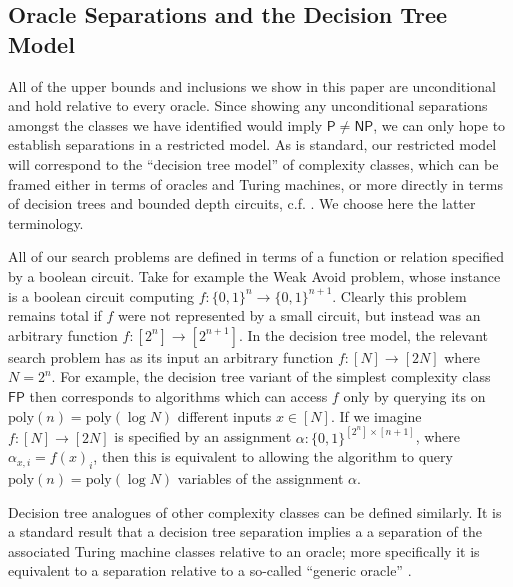 \documentclass[11pt]{article}
\newcommand{\B}{\{0,1\}}
\newcommand{\poly}{\mathrm{poly}}
\begin{document}
\subsection{Oracle Separations and the Decision Tree Model}
\label{prelim:querymodels}

All of the upper bounds and inclusions we show in this paper are unconditional and hold relative to every oracle. Since showing any unconditional separations amongst the classes we have identified would imply $\mathsf{P} \neq \mathsf{NP}$, we can only hope to establish separations in a restricted model. As is standard, our restricted model will correspond to the ``decision tree model'' of complexity classes, which can be framed either in terms of oracles and Turing machines, or more directly in terms of decision trees and bounded depth circuits, c.f. \cite{cook}. We choose here the latter terminology. 

All of our search problems are defined in terms of a function or relation specified by a boolean circuit. Take for example the Weak Avoid problem, whose instance is a boolean circuit computing $f: \B^n \to \B^{n+1}$. Clearly this problem remains total if $f$ were not represented by a small circuit, but instead was an arbitrary function $f: [2^n] \to [2^{n+1}]$. In the decision tree model, the relevant search problem has as its input an arbitrary function $f: [N] \to [2N]$ where $N = 2^n$. For example, the decision tree variant of the simplest complexity class $\mathsf{FP}$ then corresponds to algorithms which can access $f$ only by querying its on $\poly(n) = \poly(\log N)$ different inputs $x \in [N]$. If we imagine $f: [N] \to [2N]$ is specified by an assignment $\alpha: \B^{[2^n] \times [n+1]}$, where $\alpha_{x,i} = f(x)_i$, then this is equivalent to allowing the algorithm to query $\poly(n)=\poly(\log N)$ variables of the assignment $\alpha$. 

Decision tree analogues of other complexity classes can be defined similarly. It is a standard result that a decision tree separation implies a a separation of the associated Turing machine classes relative to an oracle; more specifically it is equivalent to a separation relative to a so-called ``generic oracle'' \cite{BeameCEIP98}.
\end{document}
